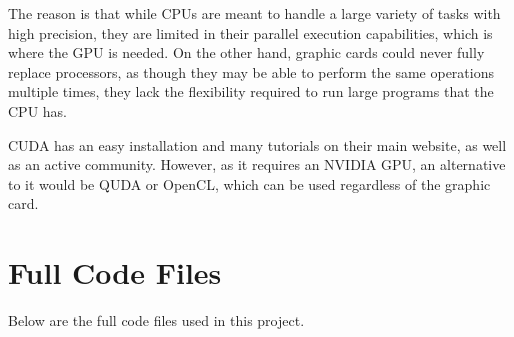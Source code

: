 The reason is that while CPUs are meant to handle a large variety of tasks with high precision, they are limited in their parallel execution capabilities, which is where the GPU is needed. On the other hand, graphic cards could never fully replace processors, as though they may be able to perform the same operations multiple times, they lack the flexibility required to run large programs that the CPU has.

CUDA has an easy installation and many tutorials on their main website, as well as an active community. However, as it requires an NVIDIA GPU, an alternative to it would be QUDA\textsuperscript{\cite{quda}} or OpenCL\textsuperscript{\cite{opencl}}, which can be used regardless of the graphic card.
\clearpage

\section{Full Code Files}

Below are the full code files used in this project.

